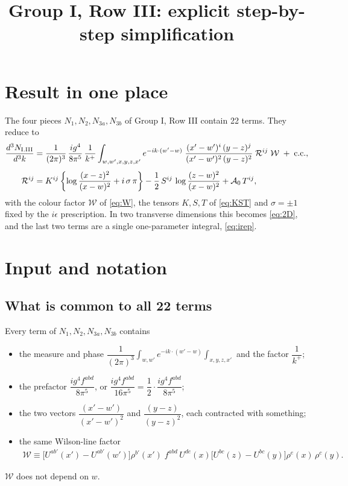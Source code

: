 \documentclass[10pt]{article}
\title{Group I, Row III: explicit step-by-step simplification}
\author{}
\date{}
\numberwithin{equation}{section}
\begin{document}
\maketitle
\tableofcontents

\section{Result in one place}

The four pieces $N_{1},N_{2},N_{3a},N_{3b}$ of Group I, Row III contain 22 terms. They reduce to
\begin{align}
\frac{d^{3}N_{\rm I.III}}{d^{3}k}&=\frac{1}{(2\pi)^{3}}\,\frac{i g^{4}}{8\pi^{5}}\,\frac{1}{k^{+}}\int_{w,w',x,y,z,x'}e^{-ik\cdot(w'-w)}\;
\frac{(x'-w')^{i}\,(y-z)^{j}}{(x'-w')^{2}\,(y-z)^{2}}\;\mathcal{R}^{ij}\;\mathcal{W}\;+\;{\rm c.c.},\\[4pt]
\mathcal{R}^{ij}&=K^{ij}\left\{\log\frac{(x-z)^{2}}{(x-w)^{2}}+i\,\sigma\,\pi\right\}
-\frac12\,S^{ij}\,\log\frac{(z-w)^{2}}{(x-w)^{2}}+\mathcal{A}_{0}\,T^{ij}, \label{eq:main}
\end{align}
with the colour factor $\mathcal{W}$ of \eqref{eq:W}, the tensors $K,S,T$ of \eqref{eq:KST} and $\sigma=\pm1$ fixed by the $i\epsilon$ prescription. In two transverse dimensions this becomes \eqref{eq:2D}, and the last two terms are a single one-parameter integral, \eqref{eq:irep}.

\section{Input and notation}

\subsection{What is common to all 22 terms}
Every term of $N_{1},N_{2},N_{3a},N_{3b}$ contains
\begin{itemize}
\item the measure and phase $\dfrac{1}{(2\pi)^{3}}\displaystyle\int_{w,w'}e^{-ik\cdot(w'-w)}\int_{x,y,z,x'}$ and the factor $\dfrac{1}{k^{+}}$;
\item the prefactor $\dfrac{ig^{4}f^{abd}}{8\pi^{5}}$, or $\dfrac{ig^{4}f^{abd}}{16\pi^{5}}=\dfrac12\cdot\dfrac{ig^{4}f^{abd}}{8\pi^{5}}$;
\item the two vectors $\dfrac{(x'-w')}{(x'-w')^{2}}$ and $\dfrac{(y-z)}{(y-z)^{2}}$, each contracted with something;
\item the same Wilson-line factor
\begin{align}
\mathcal{W}\equiv\Big[U^{ab'}(x')-U^{ab'}(w')\Big]\rho^{b'}(x')\;f^{abd}\,U^{de}(x)\Big[U^{bc}(z)-U^{bc}(y)\Big]\rho^{e}(x)\,\rho^{c}(y). \label{eq:W}
\end{align}
\end{itemize}
$\mathcal{W}$ does not depend on $w$.
\end{document}
